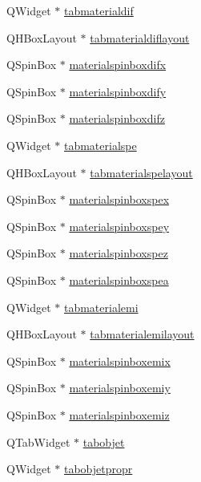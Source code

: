 \begin{DoxyCompactItemize}
\item 
Q\+Widget $\ast$ \hyperlink{class_mondock_a1d05427fb146c04086803be70153d868}{tabmaterialdif}
\item 
Q\+H\+Box\+Layout $\ast$ \hyperlink{class_mondock_a346764281a416f9221d71a96cf9ce4fc}{tabmaterialdiflayout}
\item 
Q\+Spin\+Box $\ast$ \hyperlink{class_mondock_abf580ff2de20747ff28cb3af69aec147}{materialspinboxdifx}
\item 
Q\+Spin\+Box $\ast$ \hyperlink{class_mondock_ab1c4bb9e29202b1fcb3d4f2f2f7112a8}{materialspinboxdify}
\item 
Q\+Spin\+Box $\ast$ \hyperlink{class_mondock_abaa05027f2871448e35b82516e0559b8}{materialspinboxdifz}
\item 
Q\+Widget $\ast$ \hyperlink{class_mondock_a7f99e6c98995aa1e236e44be190e0fa6}{tabmaterialspe}
\item 
Q\+H\+Box\+Layout $\ast$ \hyperlink{class_mondock_a705948bf976e373b5afb90c9f0641580}{tabmaterialspelayout}
\item 
Q\+Spin\+Box $\ast$ \hyperlink{class_mondock_a964af1b06eda72c95695ff25146892ec}{materialspinboxspex}
\item 
Q\+Spin\+Box $\ast$ \hyperlink{class_mondock_a38fad0c6901791690bdedba633bc3220}{materialspinboxspey}
\item 
Q\+Spin\+Box $\ast$ \hyperlink{class_mondock_ab5e93ab98c43f314fa48b84be8098beb}{materialspinboxspez}
\item 
Q\+Spin\+Box $\ast$ \hyperlink{class_mondock_a62de223ddabe875e9406fd43b892a8a0}{materialspinboxspea}
\item 
Q\+Widget $\ast$ \hyperlink{class_mondock_af4e2b3e87db243b8813a3e71cbf9dd7d}{tabmaterialemi}
\item 
Q\+H\+Box\+Layout $\ast$ \hyperlink{class_mondock_afc37221d5733642eeeeaf93042d72dcb}{tabmaterialemilayout}
\item 
Q\+Spin\+Box $\ast$ \hyperlink{class_mondock_a003c7eff97a356c6dc6d7f892719e91f}{materialspinboxemix}
\item 
Q\+Spin\+Box $\ast$ \hyperlink{class_mondock_a92982a92a14d612a49dd027cb68b6d73}{materialspinboxemiy}
\item 
Q\+Spin\+Box $\ast$ \hyperlink{class_mondock_ab95fca34ebe4db052bab4109eaf5afd1}{materialspinboxemiz}
\item 
Q\+Tab\+Widget $\ast$ \hyperlink{class_mondock_a3f12af44327a1739e8818ee91649ebbf}{tabobjet}
\item 
Q\+Widget $\ast$ \hyperlink{class_mondock_adc331c4d8373b45e636757e12a2bd5a0}{tabobjetpropr}

\end{DoxyCompactItemize}
